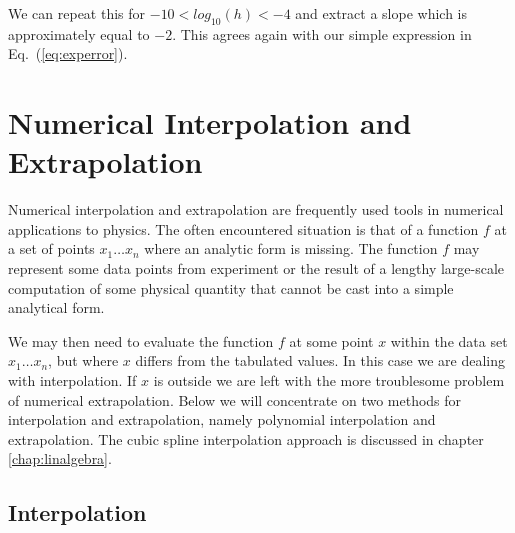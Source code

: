 We can repeat this for $-10 < log_{10}(h) < -4$ and extract a
slope which is  approximately equal to $-2$. This agrees again with our simple expression
in Eq.~(\ref{eq:experror}).




\section{Numerical Interpolation and Extrapolation}


Numerical interpolation and extrapolation are frequently 
used tools in numerical applications to physics. The often encountered
situation is that of a function $f$ at a set of points $x_1\dots x_n$ where
an analytic form is missing. The function $f$ may represent some data points
from experiment or the result of a lengthy large-scale computation of some
physical quantity that cannot be cast into a simple analytical form.

We may then need to evaluate the function $f$ at some point $x$  within  
the data set $x_1\dots x_n$, but where $x$ differs from the tabulated values.
In this case we are dealing with interpolation. If $x$ is outside 
we are left with the more troublesome problem of numerical extrapolation.
Below we will concentrate on two methods for interpolation and 
extrapolation, namely
polynomial interpolation and extrapolation.
The cubic spline interpolation approach is discussed in chapter \ref{chap:linalgebra}.



\subsection{Interpolation} \label{subsec:interpol}


